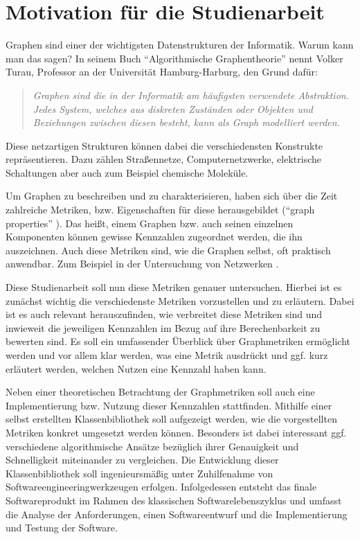 \documentclass[a4paper,12pt,ngerman,chapterprefix=false,listof=totoc,bibliography=totoc]{scrreprt}
\newcommand{\zitat}[2]{
	\begin{quote}
		\textit{#1} \cite{#2}
	\end{quote}
}
\begin{document}
\section{Motivation für die Studienarbeit}{
Graphen sind einer der wichtigsten Datenstrukturen der Informatik. Warum kann man das sagen? In seinem Buch "`Algorithmische Graphentheorie"' nennt Volker Turau, Professor an der Universität Hamburg-Harburg, den Grund dafür: 
\zitat{Graphen sind die in der Informatik am häufigsten verwendete Abstraktion. Jedes System, welches aus diskreten Zuständen oder Objekten und Beziehungen zwischen diesen besteht, kann als Graph modelliert werden.}{turau_algorithmische_2004}
Diese netzartigen Strukturen können dabei die verschiedensten Konstrukte repräsentieren. Dazu zählen Straßennetze, Computernetzwerke, elektrische Schaltungen aber auch zum Beispiel chemische Moleküle. \cite{tittmann_graphentheorie_2019}

Um Graphen zu beschreiben und zu charakterisieren, haben sich über die Zeit zahlreiche Metriken, bzw. Eigenschaften für diese herausgebildet ("`graph properties"' \cite{lovasz_large_2012}). Das heißt, einem Graphen bzw. auch seinen einzelnen Komponenten können gewisse Kennzahlen zugeordnet werden, die ihn auszeichnen. Auch diese Metriken sind, wie die Graphen selbst, oft praktisch anwendbar. Zum Beispiel in der Untersuchung von Netzwerken \cite{ellens_graph_2013}.

Diese Studienarbeit soll nun diese Metriken genauer untersuchen. Hierbei ist es zunächst wichtig die verschiedenste Metriken vorzustellen und zu erläutern. Dabei ist es auch relevant herauszufinden, wie verbreitet diese Metriken sind und inwieweit die jeweiligen Kennzahlen im Bezug auf ihre Berechenbarkeit zu bewerten sind. Es soll ein umfassender Überblick über Graphmetriken ermöglicht werden und vor allem klar werden, was eine Metrik ausdrückt und ggf. kurz erläutert werden, welchen Nutzen eine Kennzahl haben kann.

Neben einer theoretischen Betrachtung der Graphmetriken soll auch eine Implementierung bzw. Nutzung dieser Kennzahlen stattfinden. Mithilfe einer selbst erstellten Klassenbibliothek soll aufgezeigt werden, wie die vorgestellten Metriken konkret umgesetzt werden können. Besonders ist dabei interessant ggf. verschiedene algorithmische Ansätze bezüglich ihrer Genauigkeit und Schnelligkeit miteinander zu vergleichen. Die Entwicklung dieser Klassenbibliothek soll ingenieursmäßig unter Zuhilfenahme von Softwareengineeringwerkzeugen erfolgen. Infolgedessen entsteht das finale Softwareprodukt im Rahmen des klassischen Softwarelebenszyklus und umfasst die Analyse der Anforderungen, einen Softwareentwurf und die Implementierung und Testung der Software. \cite{balzert_lehrbuch_2009,balzert_lehrbuch_2011}

}
\end{document}
